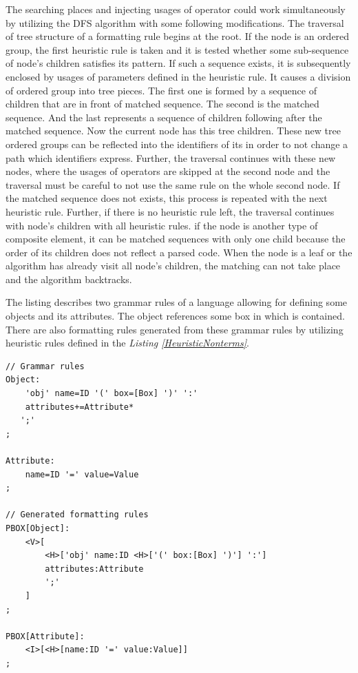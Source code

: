 \documentclass[12pt,notitlepage,a4paper]{report}
\begin{document}
The searching places and injecting usages of operator could work simultaneously by utilizing the DFS algorithm \cite{DFS} with some following modifications. The traversal of tree structure of a formatting rule begins at the root. If the node is an ordered group, the first heuristic rule is taken and it is tested whether some sub-sequence of node's children satisfies its pattern.  If such a sequence exists, it is subsequently enclosed by usages of parameters defined in the heuristic rule. It causes a division of ordered group into tree pieces. The first one is formed by a sequence of children that are in front of matched sequence. The second is the matched sequence. And the last represents  a sequence of children following after the matched sequence. Now the current node has this tree children. These new tree ordered groups can be reflected into the identifiers of its in order to not change a path which identifiers express. Further, the traversal continues with these new nodes, where the usages of operators are skipped at the second node and the traversal must be careful to not use the same rule on the whole second node. If the matched sequence does not exists, this process is repeated with the next heuristic rule. Further, if there is no heuristic rule left, the traversal  continues with node's children with all heuristic rules. if the node is another type of composite element, it can be matched sequences with only one child because the order of its children does not reflect a parsed code. When the node is a leaf or the algorithm has already visit all node's children, the matching can not take place and the algorithm backtracks.

\begin{expl}\label{GeneratedFromattingRule}
The listing describes two grammar rules of a language allowing for defining some objects and its attributes. The object references some box in which is contained. There are also formatting rules generated from these grammar rules by utilizing heuristic rules defined in the \textit{Listing \ref{HeuristicNonterms}}.
\begingroup
\fontsize{10pt}{12pt}
\begin{Verbatim}[commandchars=\\\{\}]
// Grammar rules
Object:
    'obj' name=ID '(' box=[Box] ')' ':'
	attributes+=Attribute*
   ';'
;

Attribute:
    name=ID '=' value=Value
;

// Generated formatting rules
PBOX[Object]:
    <V>[
        <H>['obj' name:ID <H>['(' box:[Box] ')'] ':']
        attributes:Attribute
        ';'
    ]
;

PBOX[Attribute]:
    <I>[<H>[name:ID '=' value:Value]]
;
\end{Verbatim}
\endgroup
\end{expl}
\end{document}

